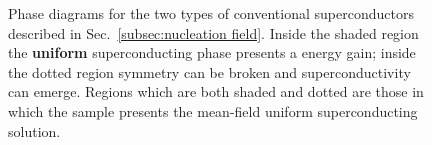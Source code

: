 \begin{figure}
	\centering
	\def\ratio{1/3}
	\caption{Phase diagrams for the two types of conventional superconductors described in Sec.~\ref{subsec:nucleation field}. Inside the shaded region the \textbf{uniform} superconducting phase presents a energy gain; inside the dotted region symmetry can be broken and superconductivity can emerge. Regions which are both shaded and dotted are those in which the sample presents the mean-field uniform superconducting solution.}
	\label{fig:type i type ii superconductor phase diagram}
\end{figure}

